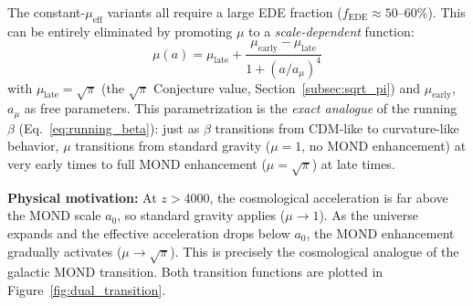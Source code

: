 \documentclass[aps,prd,twocolumn,superscriptaddress,nofootinbib,floatfix]{revtex4-2}
\begin{document}
The constant-$\mu_{\mathrm{eff}}$ variants all require a large EDE fraction ($f_{\mathrm{EDE}} \approx 50$--$60\%$). This can be entirely eliminated by promoting $\mu$ to a \textit{scale-dependent} function:
\begin{equation}
\mu(a) = \mu_{\mathrm{late}} + \frac{\mu_{\mathrm{early}} - \mu_{\mathrm{late}}}{1 + (a/a_\mu)^4}
\label{eq:mu_running}
\end{equation}
with $\mu_{\mathrm{late}} = \sqrt{\pi}$ (the $\sqrt{\pi}$ Conjecture value, Section~\ref{subsec:sqrt_pi}) and $\mu_{\mathrm{early}}$, $a_\mu$ as free parameters. This parametrization is the \textit{exact analogue} of the running $\beta$ (Eq.~\ref{eq:running_beta}): just as $\beta$ transitions from CDM-like to curvature-like behavior, $\mu$ transitions from standard gravity ($\mu = 1$, no MOND enhancement) at very early times to full MOND enhancement ($\mu = \sqrt{\pi}$) at late times.

\textbf{Physical motivation:} At $z > 4000$, the cosmological acceleration is far above the MOND scale $a_0$, so standard gravity applies ($\mu \to 1$). As the universe expands and the effective acceleration drops below $a_0$, the MOND enhancement gradually activates ($\mu \to \sqrt{\pi}$). This is precisely the cosmological analogue of the galactic MOND transition. Both transition functions are plotted in Figure~\ref{fig:dual_transition}.
\end{document}
